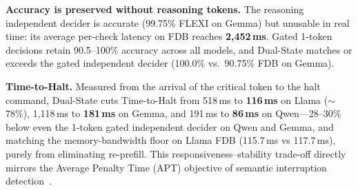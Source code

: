 \documentclass{article}
\begin{document}
\begin{table}[t]
\centering
\caption{\textbf{Interruption accuracy and physical latency.} Avg.\ latency is mean per-check decision latency on FDB; Time-to-Halt is measured on true positives. Full tables with confusion matrices and FLEXI latencies in Appendix~\ref{app:full_tables}.}
\label{tab:main_results}
\renewcommand{\arraystretch}{0.88}
\end{table}

\textbf{Accuracy is preserved without reasoning tokens.} The reasoning independent decider is accurate (99.75\% FLEXI on Gemma) but unusable in real time: its average per-check latency on FDB reaches \textbf{2{,}452\,ms}. Gated 1-token decisions retain 90.5--100\% accuracy across all models, and Dual-State matches or exceeds the gated independent decider (100.0\% vs.\ 90.75\% FDB on Gemma).

\textbf{Time-to-Halt.} Measured from the arrival of the critical token to the halt command, Dual-State cuts Time-to-Halt from 518\,ms to \textbf{116\,ms} on Llama ($\sim$78\%), 1{,}118\,ms to \textbf{181\,ms} on Gemma, and 191\,ms to \textbf{86\,ms} on Qwen---28--30\% below even the 1-token gated independent decider on Qwen and Gemma, and matching the memory-bandwidth floor on Llama FDB (115.7\,ms vs 117.7\,ms), purely from eliminating re-prefill. This responsiveness--stability trade-off directly mirrors the Average Penalty Time (APT) objective of semantic interruption detection~\citep{xia2026sidbench}.
\end{document}
